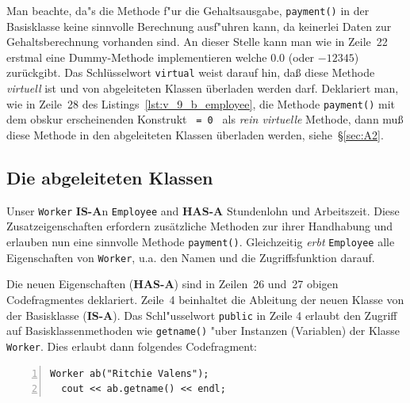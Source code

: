 
Man beachte, da"s die Methode f"ur die Gehaltsausgabe, \verb|payment()|
in der Basisklasse keine sinnvolle Berechnung ausf"uhren kann, da keinerlei
Daten zur Gehaltsberechnung vorhanden sind. An dieser Stelle kann man wie in Zeile~22 erstmal eine
Dummy-Methode implementieren welche $0.0$ (oder $-12345$) zurückgibt. 
Das Schlüsselwort \texttt{virtual} weist darauf hin, 
daß diese Methode \emph{virtuell} ist und von abgeleiteten Klassen überladen werden darf.
Deklariert man, wie in Zeile~28 des Listings~\ref{lst:v_9_b_employee}, die Methode 
\verb|payment()| mit dem obskur erscheinenden Konstrukt \verb| = 0 | als \emph{rein virtuelle} Methode, 
dann muß diese Methode in den abgeleiteten Klassen überladen werden, 
siehe~\S\ref{sec:A2}.
%
%
\subsection{Die abgeleiteten Klassen}
\label{sec:A1.3}
%
Unser \texttt{Worker} \textbf{IS-A}n \texttt{Employee} and
\textbf{HAS-A} Stundenlohn und Arbeitszeit.
Diese Zusatzeigenschaften erfordern zusätzliche Methoden
zur ihrer Handhabung und
erlauben nun eine sinnvolle Methode \verb|payment()|.
Gleichzeitig \emph{erbt} \texttt{Employee} alle Eigenschaften von \texttt{Worker}, 
u.a. den Namen und die Zugriffsfunktion darauf.


Die neuen Eigenschaften (\textbf{HAS-A}) sind in Zeilen~26 und~27 obigen Codefragmentes deklariert.
Zeile~4 beinhaltet die Ableitung der neuen Klasse von der Basisklasse (\textbf{IS-A}).
Das Schl"usselwort \verb|public| in Zeile 4 erlaubt den Zugriff auf Basisklassenmethoden
wie \verb|getname()| "uber Instanzen (Variablen) der Klasse \verb|Worker|.
Dies erlaubt dann folgendes Codefragment:

\begin{lstlisting}[caption={Public Methode der Basisklasse verwenden.},label=lst:ritchie,
basicstyle=\scriptsize,numbers=left, numberstyle=\tiny, stepnumber=2, numbersep=5pt]
  Worker ab("Ritchie Valens");
  cout << ab.getname() << endl;
\end{lstlisting}

